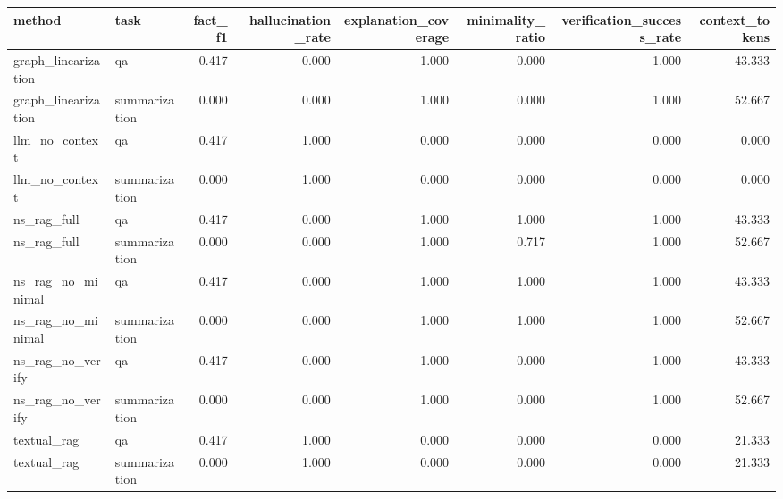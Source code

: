 \begin{tabular}{llrrrrrr}
\toprule
method & task & fact_f1 & hallucination_rate & explanation_coverage & minimality_ratio & verification_success_rate & context_tokens \\
\midrule
graph_linearization & qa & 0.417 & 0.000 & 1.000 & 0.000 & 1.000 & 43.333 \\
graph_linearization & summarization & 0.000 & 0.000 & 1.000 & 0.000 & 1.000 & 52.667 \\
llm_no_context & qa & 0.417 & 1.000 & 0.000 & 0.000 & 0.000 & 0.000 \\
llm_no_context & summarization & 0.000 & 1.000 & 0.000 & 0.000 & 0.000 & 0.000 \\
ns_rag_full & qa & 0.417 & 0.000 & 1.000 & 1.000 & 1.000 & 43.333 \\
ns_rag_full & summarization & 0.000 & 0.000 & 1.000 & 0.717 & 1.000 & 52.667 \\
ns_rag_no_minimal & qa & 0.417 & 0.000 & 1.000 & 1.000 & 1.000 & 43.333 \\
ns_rag_no_minimal & summarization & 0.000 & 0.000 & 1.000 & 1.000 & 1.000 & 52.667 \\
ns_rag_no_verify & qa & 0.417 & 0.000 & 1.000 & 0.000 & 1.000 & 43.333 \\
ns_rag_no_verify & summarization & 0.000 & 0.000 & 1.000 & 0.000 & 1.000 & 52.667 \\
textual_rag & qa & 0.417 & 1.000 & 0.000 & 0.000 & 0.000 & 21.333 \\
textual_rag & summarization & 0.000 & 1.000 & 0.000 & 0.000 & 0.000 & 21.333 \\
\bottomrule
\end{tabular}
